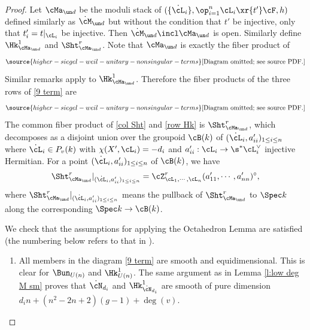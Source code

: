 \begin{proof}
Let $\cMa_{\un d}$ be the moduli stack of $(\{\dot\cL_{i}\}, \op_{i=1}^{n}\cL_{i}\xr{t'} \cF,h)$ defined similarly as $\dot\cM_{\un d}$ but without the condition that $t'$ be injective, only that $t'_{i}=t|_{\cL_{i}}$ be injective. Then $\dot\cM_{\un d}\incl \cMa_{\un d}$ is open. Similarly define $\Hk^{1}_{\cMa_{\un d}}$ and $\Sht^{r}_{\cMa_{\un d}}$. Note that $\cMa_{\un d}$ is exactly the fiber product of
\begin{equation}\label{Mbar d}
\source{higher-siegel-weil-unitary-nonsingular-terms}
\text{[Diagram omitted; see source PDF.]}
\end{equation}
Similar remarks apply to $\Hk^{1}_{\cMa_{\un d}}$.  Therefore the fiber products of the three rows of \eqref{9 term} are
\begin{equation}\label{row Hk}
\source{higher-siegel-weil-unitary-nonsingular-terms}
\text{[Diagram omitted; see source PDF.]}
\end{equation}
The common fiber product of \eqref{col Sht} and \eqref{row Hk} is $\Sht^{r}_{\cMa_{\un d}}$, which decomposes as a disjoint union over the groupoid $\cB(k)$ of $(\dot\cL_{i},a'_{ii})_{1\le i\le n}$ where $\dot\cL_{i}\in P_{v}(k)$ with $\chi(X',\cL_{i})=-d_{i}$ and $a'_{ii}:\cL_{i}\to\s^{*}\cL_{i}^{\vee}$ injective Hermitian. For a point ${(\dot\cL_{i}, a'_{ii})_{1\le i\le n}}$ of $\cB(k)$, we have
\begin{equation}
\Sht^{r}_{\cMa_{\un d}}|_{(\dot\cL_{i}, a'_{ii})_{1\le i\le n}} = \cZ^{r}_{\cL_{1},\cdots,\cL_{n}}(a'_{11},\cdots, a'_{nn})^{\circ},
\end{equation}
where $\Sht^{r}_{\cMa_{\un d}}|_{(\dot\cL_{i}, a'_{ii})_{1\le i\le n}}$ means the pullback of $
\Sht^{r}_{\cMa_{\un d}}$ to $\Spec k$ along the corresponding $\Spec k \rightarrow \cB(k)$.

We check that the assumptions for applying the Octahedron Lemma are satisfied (the numbering below refers to that in \cite[Theorem A.10]{YZ}).
\begin{enumerate}
\item All members in the diagram \eqref{9 term} are smooth and equidimensional. This is clear for $\Bun_{U(n)}$ and $\Hk^1_{U(n)}$. The same argument as in Lemma \ref{l:low deg M sm} proves that $\dot\cN_{d_{i}}$ and $\Hk^{1}_{\dot\cN_{d_{i}}}$ are smooth of pure dimension $d_{i}n+(n^2-2n+2)(g-1)+\deg(v)$.


\end{enumerate}
\end{proof}
